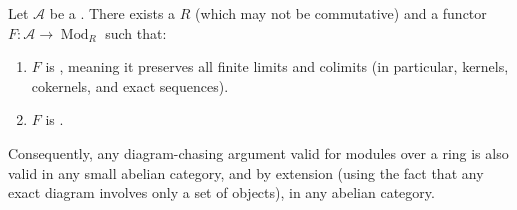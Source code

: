 \begin{theorem} \label{theorem:freyd_mitchell_embedding_theorem_for_small_abelian_categories}
    Let $\mathcal{A}$ be a  .
    There exists a  $R$ (which may not be commutative) and a functor $F: \mathcal{A} \to \operatorname{Mod}_R$ such that:
    \begin{enumerate}
        \item $F$ is , meaning it preserves all finite limits and colimits (in particular, kernels, cokernels, and exact sequences).
        \item $F$ is .
    \end{enumerate}
    Consequently, any diagram-chasing argument valid for modules over a ring is also valid in any small abelian category, and by extension (using the fact that any exact diagram involves only a set of objects), in any abelian category.
\end{theorem}

